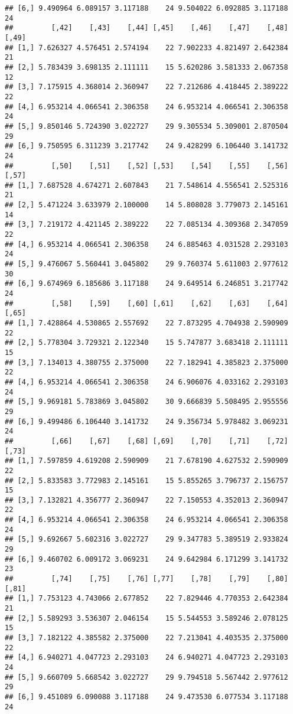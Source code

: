 \documentclass[]{article}
\begin{document}
\begin{verbatim}
## [6,] 9.490964 6.089157 3.117188    24 9.504022 6.092885 3.117188    24
##         [,42]    [,43]    [,44] [,45]    [,46]    [,47]    [,48] [,49]
## [1,] 7.626327 4.576451 2.574194    22 7.902233 4.821497 2.642384    21
## [2,] 5.783439 3.698135 2.111111    15 5.620286 3.581333 2.067358    12
## [3,] 7.175915 4.368014 2.360947    22 7.212686 4.418445 2.389222    22
## [4,] 6.953214 4.066541 2.306358    24 6.953214 4.066541 2.306358    24
## [5,] 9.850146 5.724390 3.022727    29 9.305534 5.309001 2.870504    29
## [6,] 9.750595 6.311239 3.217742    24 9.428299 6.106440 3.141732    24
##         [,50]    [,51]    [,52] [,53]    [,54]    [,55]    [,56] [,57]
## [1,] 7.687528 4.674271 2.607843    21 7.548614 4.556541 2.525316    21
## [2,] 5.471224 3.633979 2.100000    14 5.808028 3.779073 2.145161    14
## [3,] 7.219172 4.421145 2.389222    22 7.085134 4.309368 2.347059    22
## [4,] 6.953214 4.066541 2.306358    24 6.885463 4.031528 2.293103    24
## [5,] 9.476067 5.560441 3.045802    29 9.760374 5.611003 2.977612    30
## [6,] 9.674969 6.185686 3.117188    24 9.649514 6.246851 3.217742    24
##         [,58]    [,59]    [,60] [,61]    [,62]    [,63]    [,64] [,65]
## [1,] 7.428864 4.530865 2.557692    22 7.873295 4.704938 2.590909    22
## [2,] 5.778304 3.729321 2.122340    15 5.747877 3.683418 2.111111    15
## [3,] 7.134013 4.380755 2.375000    22 7.182941 4.385823 2.375000    22
## [4,] 6.953214 4.066541 2.306358    24 6.906076 4.033162 2.293103    24
## [5,] 9.969181 5.783869 3.045802    30 9.666839 5.508495 2.955556    29
## [6,] 9.499486 6.106440 3.141732    24 9.356734 5.978482 3.069231    24
##         [,66]    [,67]    [,68] [,69]    [,70]    [,71]    [,72] [,73]
## [1,] 7.597859 4.619208 2.590909    21 7.678190 4.627532 2.590909    22
## [2,] 5.833583 3.772983 2.145161    15 5.855265 3.796737 2.156757    15
## [3,] 7.132821 4.356777 2.360947    22 7.150553 4.352013 2.360947    22
## [4,] 6.953214 4.066541 2.306358    24 6.953214 4.066541 2.306358    24
## [5,] 9.692667 5.602316 3.022727    29 9.347783 5.389519 2.933824    29
## [6,] 9.460702 6.009172 3.069231    24 9.642984 6.171299 3.141732    23
##         [,74]    [,75]    [,76] [,77]    [,78]    [,79]    [,80] [,81]
## [1,] 7.753123 4.743066 2.677852    22 7.829446 4.770353 2.642384    21
## [2,] 5.589293 3.536307 2.046154    15 5.544553 3.589246 2.078125    15
## [3,] 7.182122 4.385582 2.375000    22 7.213041 4.403535 2.375000    22
## [4,] 6.940271 4.047723 2.293103    24 6.940271 4.047723 2.293103    24
## [5,] 9.660709 5.668542 3.022727    29 9.794518 5.567442 2.977612    29
## [6,] 9.451089 6.090088 3.117188    24 9.473530 6.077534 3.117188    24

\end{verbatim}
\end{document}
